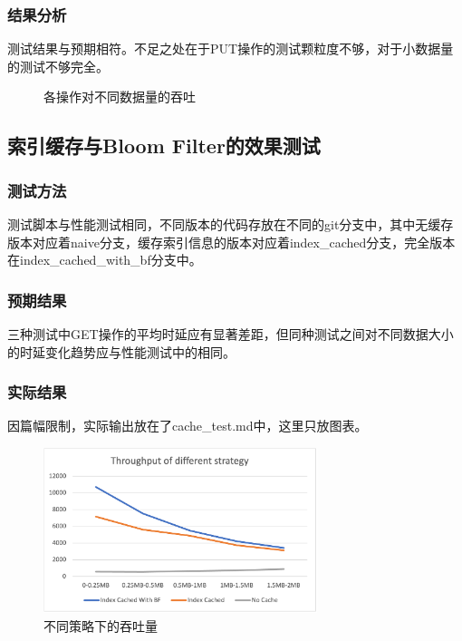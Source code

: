 \documentclass{ctexart}
\begin{document}
\subsubsection{结果分析}
测试结果与预期相符。不足之处在于PUT操作的测试颗粒度不够，对于小数据量的测试不够完全。
\begin{figure}[h!]
  \centering
  \caption{各操作对不同数据量的吞吐}
\end{figure}


\subsection{索引缓存与Bloom Filter的效果测试}

\subsubsection{测试方法}
测试脚本与性能测试相同，不同版本的代码存放在不同的git分支中，其中无缓存版本对应着naive分支，缓存索引信息的版本对应着index\_cached分支，完全版本在index\_cached\_with\_bf分支中。

\subsubsection{预期结果}
三种测试中GET操作的平均时延应有显著差距，但同种测试之间对不同数据大小的时延变化趋势应与性能测试中的相同。

\subsubsection{实际结果}
因篇幅限制，实际输出放在了cache\_test.md中，这里只放图表。
\begin{figure}[h!]
  \centering
  \includegraphics[width=8cm]{Strategy.png}
  \caption{不同策略下的吞吐量}
\end{figure}
\end{document}
